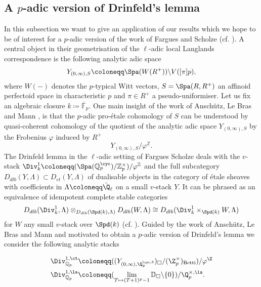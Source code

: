 \subsection{A $p$-adic version of Drinfeld's lemma}\label{Examples of Künneth morphism for analytic stacks}\label{Drinfelds section}
In this subsection we want to give an application of our results which we hope to be of interest for a $p$-adic version of the work of Fargues and Scholze (cf. \Cite{fargues2021geometrization}). A central object in their geometrisation of the $\ell$-adic local Langlands correspondence is the following analytic adic space
\[
Y_{(0,\infty),S}\coloneqq \Spa(W(R^+))\backslash V([\pi]p),
\]
where $W(-)$ denotes the $p$-typical Witt vectors, $S=\Spa(R,R^+)$ an affinoid perfectoid space in characteristic $p$ and $\pi\in R^+$ a pseudo-uniformiser. Let us fix an algebraic closure $k\coloneqq \bar{\mathbb{F}}_p$. One main insight of the work of Anschütz, Le Bras and Mann \cite{anschütz20246functorformalismsolidquasicoherent}, is that the $p$-adic pro-étale cohomology of $S$ can be understood by quasi-coherent cohomology of the quotient of the analytic adic space $Y_{(0,\infty),S}$ by the Frobenius $\varphi$ induced by $R^+$
\[
Y_{(0,\infty),S}/\varphi^{\mathbb{Z}}.
\]
The Drinfeld lemma in the $\ell$-adic setting of Fargues Scholze deals with the $v$-stack \newline $\Div_k^1\coloneqq (\Spa(\mathbb{Q}_p^{\cyc})/\mathbb{Z}_p^\times)/\varphi^{\mathbb{Z}}$ and the full subcategory $D_{dlb}(Y,\Lambda)\subset D_{et}(Y,\Lambda)$ of dualisable objects in the category of étale sheaves with coefficients in $\Lambda\coloneqq \Bar{\Q}_{\ell}$ on a small $v$-stack $Y$. It can be phrased as an equivalence of idempotent complete stable categories 
\[
D_{dlb}(\Div_k^1,\Lambda)\otimes_{D_{dlb}(\Spd(k),\Lambda)}D_{dlb}(W,\Lambda) \cong D_{dlb}(\Div_k^{1}\times_{\Spd(k)}W,\Lambda) 
\]
for $W$ any small $v$-stack over $\Spd(k)$ (cf. \Cite[Chapter IV.7.3]{fargues2021geometrization}). 
Guided by the work of Anschütz, Le Bras and Mann and motivated to obtain a $p$-adic version of Drinfeld's lemma we consider the following analytic stacks

\begin{align*}
    \Div_{\mathbb{Q}_p}^{1,\ct}\coloneqq & ((Y_{(0,\infty), \Q_p^{\cyc,b}})_{\square}/(\Z_p^{\times})_{\text{Betti}})/\varphi^{\Z} \\
\Div_{\mathbb{Q}_p}^{1,\la}\coloneqq & (\lim_{T\mapsto (T+1)^p-1}\mathbb{D}_{\square} \backslash \{0\} )/\Q_p^{\times, \la}.
\end{align*}

